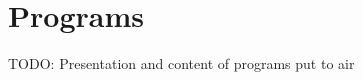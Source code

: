 \documentclass[../StudioOperationGuide.tex]{subfiles}
\begin{document}
\chapter{Programs}
TODO: Presentation and content of programs put to air
\end{document}
